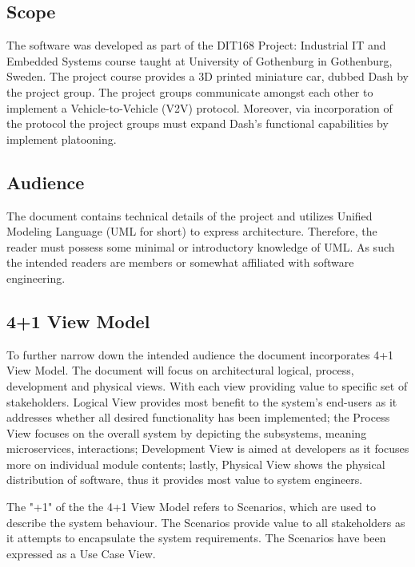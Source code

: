\documentclass[12pt]{article}
\begin{document}
\subsection{Scope}
The software was developed as part of the DIT168 Project: Industrial IT and Embedded Systems course taught at University of Gothenburg in Gothenburg, Sweden. The project course provides a 3D printed miniature car, dubbed Dash by the project group. The project groups communicate amongst each other to implement a Vehicle-to-Vehicle (V2V) protocol. Moreover, via incorporation of the protocol the project groups must expand Dash’s functional capabilities by implement platooning.\par

\subsection{Audience}
The document contains technical details of the project and utilizes Unified Modeling Language (UML for short) to express architecture. Therefore, the reader must possess some minimal or introductory knowledge of UML. As such the intended readers are members or somewhat affiliated with software engineering.
    
\subsection{4+1 View Model}
To further narrow down the intended audience the document incorporates 4+1 View Model. The document will focus on architectural logical, process, development and physical views. With each view providing value to specific set of stakeholders. Logical View provides most benefit to the system's end-users as it addresses whether all desired functionality has been implemented; the Process View focuses on the overall system by depicting the subsystems, meaning microservices, interactions; Development View is aimed at developers as it focuses more on individual module contents; lastly, Physical View shows the physical distribution of software, thus it provides most value to system engineers. \par
The "+1" of the the 4+1 View Model refers to Scenarios, which are used to describe the system behaviour. The Scenarios provide value to all stakeholders as it attempts to encapsulate the system requirements. The Scenarios have been expressed as a Use Case View. \par

\pagebreak
\end{document}
